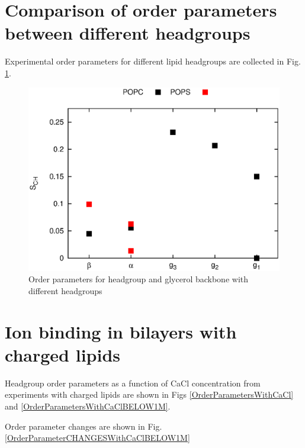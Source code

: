 \documentclass[aps,prl,superscriptaddress,twocolumn]{revtex4}
\begin{document}


\section{Comparison of order parameters between different headgroups}

Experimental order parameters for different lipid headgroups are
collected in Fig. \ref{HGorderParameters}.
\begin{figure}[]
  \centering
  \includegraphics[width=17.2cm]{../Figs/HGorderparameters.eps}
  \caption{\label{HGorderParameters}
    Order parameters for headgroup and glycerol backbone with different headgroups
  }
\end{figure}

\section{Ion binding in bilayers with charged lipids}

Headgroup order parameters as a function of CaCl concentration
from experiments with charged lipids are shown in Figs \ref{OrderParametersWithCaCl}
and \ref{OrderParametersWithCaClBELOW1M}.

Order parameter changes are shown in Fig. \ref{OrderParameterCHANGESWithCaClBELOW1M}
\end{document}
